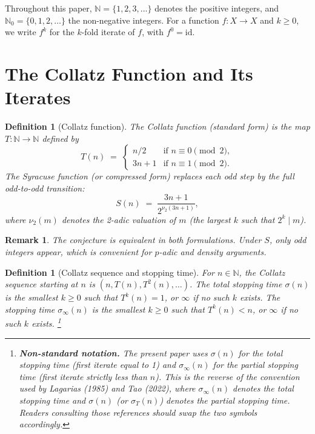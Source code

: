 \documentclass[12pt,a4paper]{article}
\newtheorem{definition}[theorem]{Definition}
\newtheorem{remark}[theorem]{Remark}
\begin{document}
Throughout this paper, $\mathbb{N} = \{1, 2, 3, \ldots\}$ denotes the positive integers,
and $\mathbb{N}_0 = \{0, 1, 2, \ldots\}$ the non-negative integers. For a function
$f\colon X \to X$ and $k \geq 0$, we write $f^k$ for the $k$-fold iterate of $f$,
with $f^0 = \mathrm{id}$.

\section{The Collatz Function and Its Iterates}

\begin{definition}[Collatz function]\label{def:collatz}
The \emph{Collatz function} (standard form) is the map $T\colon \mathbb{N} \to \mathbb{N}$
defined by
\[
  T(n) \;=\; \begin{cases} n/2 & \text{if } n \equiv 0 \pmod{2}, \\
                            3n+1 & \text{if } n \equiv 1 \pmod{2}.
              \end{cases}
\]
The \emph{Syracuse function} (or compressed form) replaces each odd step by the full
odd-to-odd transition:
\[
  S(n) \;=\; \frac{3n+1}{2^{\nu_2(3n+1)}},
\]
where $\nu_2(m)$ denotes the 2-adic valuation of $m$ (the largest $k$ such that $2^k \mid m$).
\end{definition}

\begin{remark}\label{rem:equivalent}
The conjecture is equivalent in both formulations. Under $S$, only odd integers appear,
which is convenient for $p$-adic and density arguments.
\end{remark}

\begin{definition}[Collatz sequence and stopping time]\label{def:sequence}
For $n \in \mathbb{N}$, the \emph{Collatz sequence} starting at $n$ is
$(n, T(n), T^2(n), \ldots)$.
The \emph{total stopping time} $\sigma(n)$ is the smallest $k \geq 0$ such that
$T^k(n) = 1$, or $\infty$ if no such $k$ exists.
The \emph{stopping time} $\sigma_\infty(n)$ is the smallest $k \geq 0$ such that
$T^k(n) < n$, or $\infty$ if no such $k$ exists.%
\footnote{%
  \textbf{Non-standard notation.} The present paper uses $\sigma(n)$ for the
  \emph{total} stopping time (first iterate equal to 1) and $\sigma_\infty(n)$
  for the \emph{partial} stopping time (first iterate strictly less than $n$).
  This is the \emph{reverse} of the convention used by Lagarias (1985) and
  Tao (2022), where $\sigma_\infty(n)$ denotes the total stopping time and
  $\sigma(n)$ (or $\sigma_T(n)$) denotes the partial stopping time.
  Readers consulting those references should swap the two symbols accordingly.%
}
\end{definition}
\end{document}
